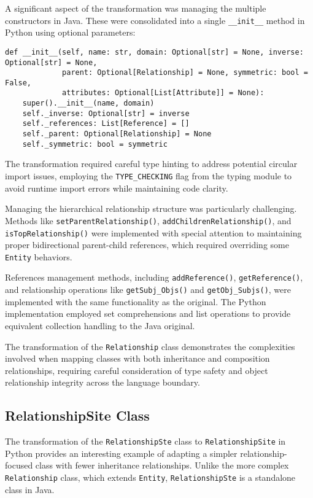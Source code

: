 \documentclass[12pt,a4paper]{article}
\begin{document}
A significant aspect of the transformation was managing the multiple constructors in Java. These were consolidated into a single \texttt{\_\_init\_\_} method in Python using optional parameters:

\begin{verbatim}
def __init__(self, name: str, domain: Optional[str] = None, inverse: Optional[str] = None,
             parent: Optional[Relationship] = None, symmetric: bool = False,
             attributes: Optional[List[Attribute]] = None):
    super().__init__(name, domain)
    self._inverse: Optional[str] = inverse
    self._references: List[Reference] = []
    self._parent: Optional[Relationship] = None
    self._symmetric: bool = symmetric
\end{verbatim}

The transformation required careful type hinting to address potential circular import issues, employing the \texttt{TYPE\_CHECKING} flag from the typing module to avoid runtime import errors while maintaining code clarity.

Managing the hierarchical relationship structure was particularly challenging. Methods like \texttt{setParentRelationship()}, \texttt{addChildrenRelationship()}, and \texttt{isTopRelationship()} were implemented with special attention to maintaining proper bidirectional parent-child references, which required overriding some \texttt{Entity} behaviors.

References management methods, including \texttt{addReference()}, \texttt{getReference()}, and relationship operations like \texttt{getSubj\_Objs()} and \texttt{getObj\_Subjs()}, were implemented with the same functionality as the original. The Python implementation employed set comprehensions and list operations to provide equivalent collection handling to the Java original.

The transformation of the \texttt{Relationship} class demonstrates the complexities involved when mapping classes with both inheritance and composition relationships, requiring careful consideration of type safety and object relationship integrity across the language boundary.


\subsection{RelationshipSite Class}
The transformation of the \texttt{RelationshipSte} class to \texttt{RelationshipSite} in Python provides an interesting example of adapting a simpler relationship-focused class with fewer inheritance relationships. Unlike the more complex \texttt{Relationship} class, which extends \texttt{Entity}, \texttt{RelationshipSte} is a standalone class in Java.
\end{document}
